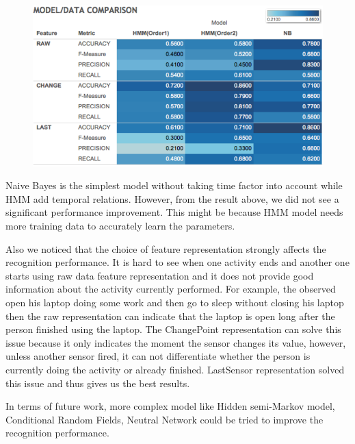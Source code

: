 \documentclass[10pt,letter]{article}
\numberwithin{equation}{section} %
\numberwithin{figure}{section} %
\numberwithin{table}{section} %
\begin{document}
\begin{figure}[h]
\centering
\includegraphics[width=15cm]{result}
\end{figure}

Naive Bayes is the simplest model without taking time factor into account while HMM add temporal relations. However, from the result above, we did not see a significant performance improvement. This might be because HMM model needs more training data to accurately learn the parameters. 

Also we noticed that the choice of feature representation strongly affects the recognition performance. It is hard to see when one activity ends and another one starts using raw data feature representation and it does not provide good information about the activity currently performed. For example, the observed open his laptop doing some work and then go to sleep without closing his laptop then the raw representation can indicate that the laptop is open long after the person finished using the laptop. The ChangePoint representation can solve this issue because it only indicates the moment the sensor changes its value, however, unless another sensor fired, it can not differentiate whether the person is currently doing the activity or already finished. LastSensor representation solved this issue and thus gives us the best results.  

In terms of future work, more complex model like Hidden semi-Markov model, Conditional Random Fields, Neutral Network could be tried to improve the recognition performance. 
\end{document}
